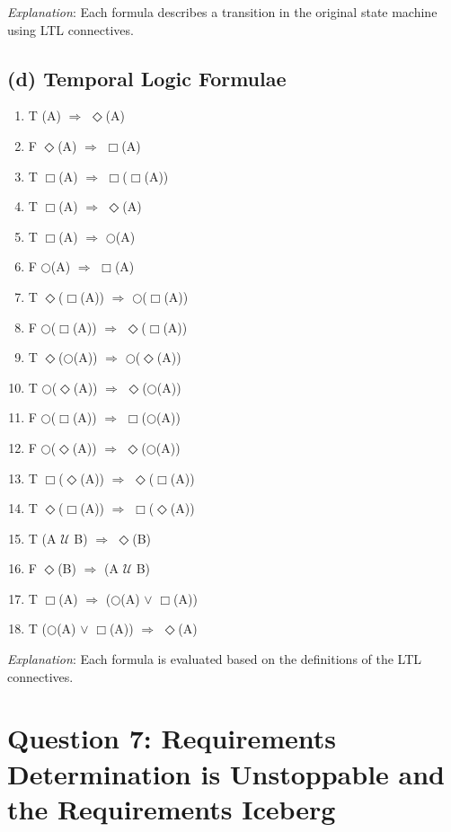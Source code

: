 \documentclass{article}
\begin{document}
\textit{Explanation}: Each formula describes a transition in the original state machine using LTL connectives.

\subsection*{(d) Temporal Logic Formulae}

\begin{enumerate}
    \item T (A) $\Rightarrow$ $\Diamond$(A)
    \item F $\Diamond$(A) $\Rightarrow$ $\Box$(A)
    \item T $\Box$(A) $\Rightarrow$ $\Box$($\Box$(A))
    \item T $\Box$(A) $\Rightarrow$ $\Diamond$(A)
    \item T $\Box$(A) $\Rightarrow$ $\bigcirc$(A)
    \item F $\bigcirc$(A) $\Rightarrow$ $\Box$(A)
    \item T $\Diamond$($\Box$(A)) $\Rightarrow$ $\bigcirc$($\Box$(A))
    \item F $\bigcirc$($\Box$(A)) $\Rightarrow$ $\Diamond$($\Box$(A))
    \item T $\Diamond$($\bigcirc$(A)) $\Rightarrow$ $\bigcirc$($\Diamond$(A))
    \item T $\bigcirc$($\Diamond$(A)) $\Rightarrow$ $\Diamond$($\bigcirc$(A))
    \item F $\bigcirc$($\Box$(A)) $\Rightarrow$ $\Box$($\bigcirc$(A))
    \item F $\bigcirc$($\Diamond$(A)) $\Rightarrow$ $\Diamond$($\bigcirc$(A))
    \item T $\Box$($\Diamond$(A)) $\Rightarrow$ $\Diamond$($\Box$(A))
    \item T $\Diamond$($\Box$(A)) $\Rightarrow$ $\Box$($\Diamond$(A))
    \item T (A $\mathcal{U}$ B) $\Rightarrow$ $\Diamond$(B)
    \item F $\Diamond$(B) $\Rightarrow$ (A $\mathcal{U}$ B)
    \item T $\Box$(A) $\Rightarrow$ ($\bigcirc$(A) $\vee$ $\Box$(A))
    \item T ($\bigcirc$(A) $\vee$ $\Box$(A)) $\Rightarrow$ $\Diamond$(A)
\end{enumerate}

\textit{Explanation}: Each formula is evaluated based on the definitions of the LTL connectives.

\section*{Question 7: Requirements Determination is Unstoppable and the Requirements Iceberg}
\end{document}
